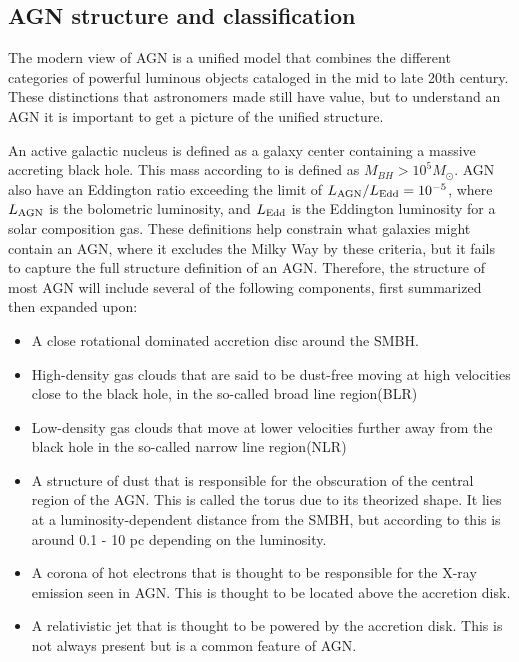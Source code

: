 \subsection{AGN structure and classification}


The modern view of AGN is a unified model that combines the different categories of powerful luminous objects cataloged in the mid to late 20th century. 
These distinctions that astronomers made still
have value, but to understand an AGN it is important to get a picture of the unified structure.

An active galactic nucleus is defined as a galaxy center containing a massive accreting black hole. This mass according to \cite{Netzer_2015} 
is defined as $M_{BH} > 10^5 M_\odot$. AGN also have an Eddington ratio exceeding
the limit of $L_{\rm AGN}/ L_{\rm Edd} = 10^{-5}$, where $L_{\rm AGN}$ is the bolometric luminosity, and $L_{\rm Edd}$ is the Eddington luminosity for a solar 
composition gas. These definitions help constrain what galaxies might contain an AGN, where it excludes the Milky Way 
by these criteria, but it fails to capture the full structure definition of an AGN. 
Therefore, the structure of most AGN will include several of the following components, first summarized then expanded upon: 


\begin{itemize}
    \item A close rotational dominated accretion disc around the SMBH. %
   \item High-density gas clouds that are said to be dust-free moving at high velocities close to the black hole, in the so-called broad line region(BLR)
    \item Low-density gas clouds that move at lower velocities further away from the black hole in the so-called narrow line region(NLR)
    \item A structure of dust that is responsible for the obscuration of the central region of the AGN. This is called the torus due to its theorized shape. 
     It lies at a luminosity-dependent distance from the SMBH, but according to \cite{Netzer_2015} this is around 0.1 - 10 pc depending on the luminosity.
    \item A corona of hot electrons that is thought to be responsible for the X-ray emission seen in AGN. This is thought to be located above the accretion disk. 
    \item A relativistic jet that is thought to be powered by the accretion disk. This is not always present but is a common feature of AGN.
\end{itemize}


